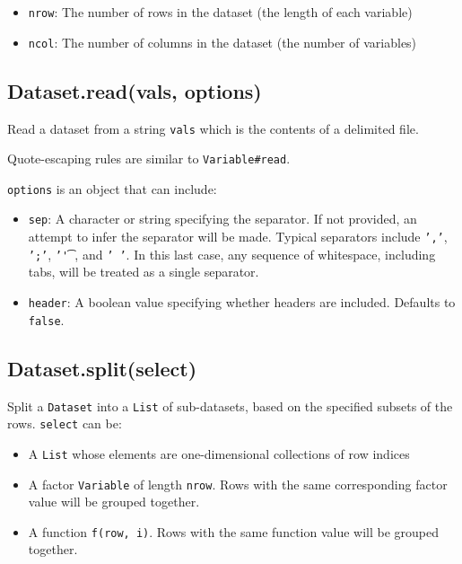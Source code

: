\documentclass{article}
\begin{document}
\begin{itemize}

\item \texttt{nrow}: The number of rows in the dataset (the length of each variable)

\item \texttt{ncol}: The number of columns in the dataset (the number of variables)

\end{itemize}

    \subsection*{Dataset.read(vals, options)}
    Read a dataset from a string \texttt{vals} which is the contents of a delimited file.


Quote-escaping rules are similar to \texttt{Variable\#read}.


\texttt{options} is an object that can include:


\begin{itemize}

\item \texttt{sep}: A character or string specifying the separator. If not provided, an attempt
to infer the separator will be made. Typical separators include \texttt{','}, \texttt{';'}, \texttt{'\t'},
and \texttt{' '}. In this last case, any sequence of whitespace, including tabs, will be
treated as a single separator.

\item \texttt{header}: A boolean value specifying whether headers are included. Defaults to \texttt{false}.

\end{itemize}

    \subsection*{Dataset.split(select)}
    Split a \texttt{Dataset} into a \texttt{List} of sub-datasets, based on the specified
subsets of the rows.  \texttt{select} can be:


\begin{itemize}

\item A \texttt{List} whose elements are one-dimensional collections of row indices

\item A factor \texttt{Variable} of length \texttt{nrow}.  Rows with the same corresponding
factor value will be grouped together.

\item A function \texttt{f(row, i)}.  Rows with the same function value will be grouped
together.

\end{itemize}
\end{document}
